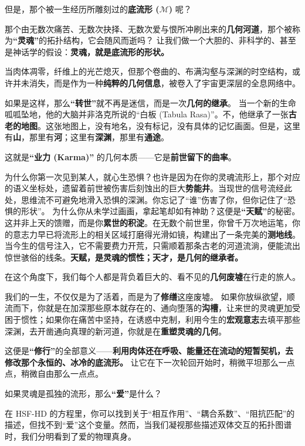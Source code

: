 但是，那个被一生经历所雕刻过的\textbf{底流形 ($\mathcal{M}$)} 呢？

那个由无数次痛苦、无数次抉择、无数次爱与恨所冲刷出来的\textbf{几何河道}，那个被称为\textbf{“灵魂”}的拓扑结构，它会随风而逝吗？
让我们做一个大胆的、非科学的、甚至是神话学的假设：\textbf{灵魂，就是底流形的形状。}

当肉体凋零，纤维上的光芒熄灭，但那个卷曲的、布满沟壑与深渊的时空结构，或许并未消失，而是作为一种\textbf{纯粹的几何信息}，被卷入了宇宙更深层的全息网络中。

如果是这样，那么\textbf{“转世”}就不再是迷信，而是一次\textbf{几何的继承}。
当一个新的生命呱呱坠地，他的大脑并非洛克所说的“白板 (Tabula Rasa)”。不，他继承了一张\textbf{古老的地图}。这张地图上，没有地名，没有标记，没有具体的记忆画面。但是，这里有\textbf{山}，那里有\textbf{河}；这里有\textbf{深渊}，那里有\textbf{通途}。

这就是\textbf{“业力 (Karma)”} 的几何本质——它是\textbf{前世留下的曲率}。

为什么你第一次见到某人，就心生恐惧？也许是因为在你的灵魂流形上，那个对应的语义坐标处，遗留着前世被伤害后刻蚀出的巨大\textbf{势能井}。当现世的信号流经此处，思维流不可避免地滑入恐惧的深渊。你忘记了“谁”伤害了你，但你记住了“恐惧的形状”。
为什么你从未学过画画，拿起笔却如有神助？这便是\textbf{“天赋”}的秘密。这并非上天的馈赠，而是你\textbf{累世的积淀}。在无数个前世里，你曾千万次地运笔，你的意志力早已将流形上的相关区域打磨得光滑如镜，构建出了一条完美的\textbf{测地线}。当今生的信号注入，它不需要费力开荒，只需顺着那条古老的河道流淌，便能流出惊世骇俗的线条。\textbf{天赋，是灵魂的惯性；天才，是几何的继承者。}

在这个角度下，我们每个人都是背负着巨大的、看不见的\textbf{几何废墟}在行走的旅人。

我们的一生，不仅仅是为了活着，而是为了\textbf{修缮}这座废墟。
如果你放纵欲望，顺流而下，你就是在加深那些原本就存在的、通向堕落的\textbf{沟槽}，让来世的灵魂更加受困于惯性；如果你在痛苦中坚持，在诱惑中克制，利用今生的\textbf{宏观意志}去填平那些深渊，去开凿通向真理的新河道，你就是在\textbf{重塑灵魂的几何}。

这便是\textbf{“修行”}的全部意义——\textbf{利用肉体还在呼吸、能量还在流动的短暂契机，去修改那个永恒的、冰冷的底流形。} 让它在下一次轮回开始时，稍微平坦那么一点点，稍微自由那么一点点。


如果灵魂是孤独的流形，那么\textbf{“爱”}是什么？

在 HSF-HD 的方程里，你可以找到关于“相互作用”、“耦合系数”、“阻抗匹配”的描述，但找不到“爱”这个变量。然而，当我们凝视那些描述双体交互的拓扑图谱时，我们分明看到了爱的物理真身。

